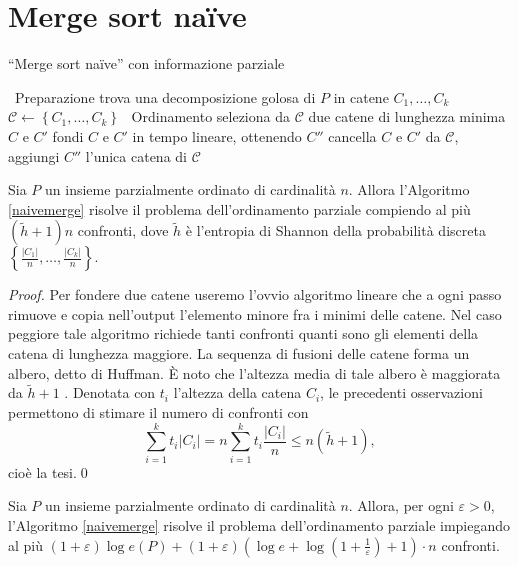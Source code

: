 \section{Merge sort na\"ive} 
\begin{algorithm}
  \caption{``Merge sort na\"ive'' con informazione parziale} \label{naivemerge} 
  \begin{algorithmic}
    [1] \STATE \, \COMMENT Preparazione \STATE trova una decomposizione golosa di \(P\) in catene \(C_1,\dots,C_k\) \STATE \(\mathcal{C}\leftarrow\left\{C_1,\dots,C_k\right\}\) \STATE \, \COMMENT Ordinamento  \STATE seleziona da \(\mathcal{C}\) due catene di lunghezza minima \(C\) e \(C'\) \STATE fondi \(C\) e \(C'\) in tempo lineare, ottenendo \(C''\) \STATE cancella \(C\) e \(C'\) da \(\mathcal{C}\), aggiungi \(C''\) \ENDWHILE \RETURN l'unica catena di \(\mathcal{C}\) 
  \end{algorithmic}
\end{algorithm}
\begin{lemma}
  \label{naivemergelemma} Sia \(P\) un insieme parzialmente ordinato di cardinalità \(n\). Allora l'Algoritmo \ref{naivemerge} risolve il problema dell'ordinamento parziale compiendo al più \((\tilde{h}+1)n\) confronti, dove \(\tilde{h}\) è l'entropia di Shannon della probabilità discreta \(\left\{\frac{|C_1|}{n},\dots,\frac{|C_k|}{n}\right\}\). 
\end{lemma}
\begin{proof}
  Per fondere due catene useremo l'ovvio algoritmo lineare che a ogni passo rimuove e copia nell'output l'elemento minore fra i minimi delle catene. Nel caso peggiore tale algoritmo richiede tanti confronti quanti sono gli elementi della catena di lunghezza maggiore. La sequenza di fusioni delle catene forma un albero, detto di Huffman. È noto che l'altezza media di tale albero è maggiorata da \(\tilde{h}+1\) \cite{Cover2006}. Denotata con \(t_i\) l'altezza della catena \(C_i\), le precedenti osservazioni permettono di stimare il numero di confronti con
  \[\sum_{i=1}^{k}{t_i|C_i|}=n\sum_{i=1}^{k}{t_i\frac{|C_i|}{n}}\le n(\tilde{h}+1),\]
  cioè la tesi.\qed 
\end{proof}
\begin{theorem}
  \label{naivemergetheorem} Sia \(P\) un insieme parzialmente ordinato di cardinalità \(n\). Allora, per ogni \(\varepsilon>0\), l'Algoritmo \ref{naivemerge} risolve il problema dell'ordinamento parziale impiegando al più \((1+\varepsilon)\log{e(P)}+(1+\varepsilon)\left(\log{e}+\log{\left(1+\frac{1}{\varepsilon}\right)}+1\right)\cdot n\) confronti. 
\end{theorem}
